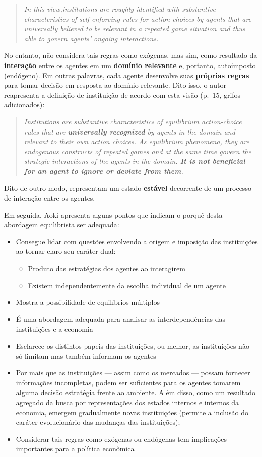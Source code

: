 \documentclass[9pt,twocolumn,twoside,lineno]{style}
\begin{document}
\begin{quote}
	\textit{In this view,institutions are roughly identified with substantive characteristics of self-enforcing rules for action choices by agents
		that are universally believed to be relevant in a repeated game situation
		and thus able to govern agents' ongoing interactions. }
\end{quote}
No entanto, não considera tais regras como exógenas, mas sim, como resultado da \textbf{interação} entre os agentes em um \textbf{domínio relevante} e, portanto, autoimposto (endógeno). Em outras palavras, cada agente desenvolve suas \textbf{próprias regras} para tomar decisão em resposta ao domínio relevante. Dito isso, o autor reapresenta a definição de instituição de acordo com esta visão (p.~15, grifos adicionados):
\begin{quote}
\textit{	Institutions are substantive characteristics of equilibrium action-choice rules that are \textbf{universally recognized} by agents in the domain and
	relevant to their own action choices. As equilibrium phenomena, they are
	endogenous constructs of repeated games and at the same time govern the
	strategic interactions of the agents in the domain. \textbf{It is not beneficial for an agent to ignore or deviate from them}.}
\end{quote}
Dito de outro modo, representam um estado \textbf{estável} decorrente de um processo de interação entre os agentes.

Em seguida, Aoki apresenta alguns pontos que indicam o porquê desta abordagem equilibrista ser adequada:
\begin{itemize}
	\item Consegue lidar com questões envolvendo a origem e imposição das instituições ao tornar claro seu caráter dual:
		\begin{itemize}
			\item Produto das estratégias dos agentes ao interagirem
			\item Existem independentemente da escolha individual de um agente
		\end{itemize}
	\item Mostra a possibilidade de equilíbrios múltiplos
	\item É uma abordagem adequada para analisar as interdependências das instituições e a economia
	\item Esclarece os distintos papeis das instituições, ou melhor, as instituições não só limitam mas também informam os agentes
	\item Por mais que as instituições --- assim como os mercados --- possam fornecer informações incompletas, podem ser suficientes para os agentes tomarem alguma decisão estratégia frente ao ambiente. Além disso, como um resultado agregado da busca por representações dos estados internos e internos da economia, emergem gradualmente novas instituições (permite a inclusão do caráter evolucionário das mudanças das instituições);
	\item Considerar tais regras como exógenas ou endógenas tem implicações importantes para a política econômica
\end{itemize}
\end{document}
